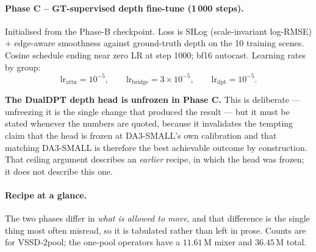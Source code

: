 \documentclass[11pt,a4paper]{article}
\begin{document}
\paragraph{Phase C -- GT-supervised depth fine-tune (1\,000 steps).}
Initialised from the Phase-B checkpoint. Loss is SILog (scale-invariant
log-RMSE) $+$ edge-aware smoothness against ground-truth depth on the 10
training scenes. Cosine schedule ending near zero LR at step 1000; bf16
autocast. Learning rates by group:
\[
  \text{lr}_{\text{attn}} = 10^{-5}, \qquad
  \text{lr}_{\text{bridge}} = 3\times10^{-5}, \qquad
  \text{lr}_{\text{dpt}} = 10^{-5}.
\]

\noindent\textbf{The DualDPT depth head is unfrozen in Phase C.} This is
deliberate --- unfreezing it is the single change that produced the result --- but
it must be stated whenever the numbers are quoted, because it invalidates the
tempting claim that the head is frozen at DA3-SMALL's own calibration and that
matching DA3-SMALL is therefore the best achievable outcome by construction.
That ceiling argument describes an \emph{earlier} recipe, in which the head was
frozen; it does not describe this one.

\paragraph{Recipe at a glance.} The two phases differ in \emph{what is allowed
to move}, and that difference is the single thing most often misread, so it is
tabulated rather than left in prose. Counts are for VSSD-2pool; the
one-pool operators have a $11.61$\,M mixer and $36.45$\,M total.
\end{document}
